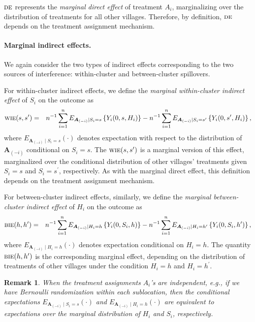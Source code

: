 \documentclass{article}
\newtheorem{remark}{Remark}[section]
\newcommand{\bA}{\boldsymbol{A}}
\newcommand{\sumi}{\sum_{i=1}^n}
\newcommand{\de}{\textsc{de}}
\newcommand{\bie}{\textsc{bie}}
\newcommand{\wie}{\textsc{wie}}
\begin{document}
$\de$ represents the \textit{marginal direct effect} of treatment $A_{i}$, marginalizing over the distribution of treatments for all other villages. Therefore, by definition, $\de$ depends on the treatment assignment mechanism.


\paragraph{Marginal indirect effects.}
We again consider the two types of indirect effects corresponding to the two sources of interference: within-cluster and between-cluster spillovers.

For within-cluster indirect effects, we define the \textit{marginal within-cluster indirect effect} of $S_{i}$ on the outcome as
\begin{eqnarray*}
    \wie(s,s^{\prime}) &=& n^{-1}\sumi E_{\bA_{(-i)}\mid S_{i} = s}\left\{Y_{i}(0,s,H_{i})\right\} - n^{-1}\sumi E_{\bA_{(-i)}\mid S_{i} = s^{\prime}}\left\{Y_{i}(0,s^{\prime},H_{i})\right\},
\end{eqnarray*}
where $E_{\bA_{(-i)}\mid S_{i} = s}(\cdot)$ denotes expectation with respect to the distribution of $\bA_{(-i)}$ conditional on $S_{i}=s$. The $\wie(s,s^{\prime})$ is a marginal version of this effect, marginalized over the conditional distribution of other villages' treatments given $S_{i}=s$ and $S_{i}=s^{\prime}$, respectively. As with the marginal direct effect, this definition depends on the treatment assignment mechanism.

For between-cluster indirect effects, similarly, we define the \textit{marginal between-cluster indirect effect} of $H_{i}$ on the outcome as
\begin{eqnarray*}
    \bie(h,h^{\prime}) &=& n^{-1}\sumi E_{\bA_{(-i)}\mid H_{i} = h}\left\{Y_{i}(0,S_{i},h)\right\} - n^{-1}\sumi E_{\bA_{(-i)}\mid H_{i} = h^{\prime}}\left\{Y_{i}(0,S_{i},h^{\prime})\right\},
\end{eqnarray*}
where $E_{\bA_{(-i)}\mid H_{i} = h}(\cdot)$ denotes expectation conditional on $H_{i}=h$. The quantity $\bie(h,h^{\prime})$ is the corresponding marginal effect, depending on the distribution of treatments of other villages under the condition $H_{i}=h$ and $H_{i}=h^{\prime}$.

\begin{remark}
    When the treatment assignments $A_{i}$'s are independent, e.g., if we have Bernoulli randomization within each sublocation, then the conditional expectations $E_{\bA_{(-i)}\mid S_{i} = s}(\cdot)$ and $E_{\bA_{(-i)}\mid H_{i} = h}(\cdot)$ are equivalent to expectations over the marginal distribution of $H_{i}$ and $S_{i}$, respectively.
\end{remark}
\end{document}
